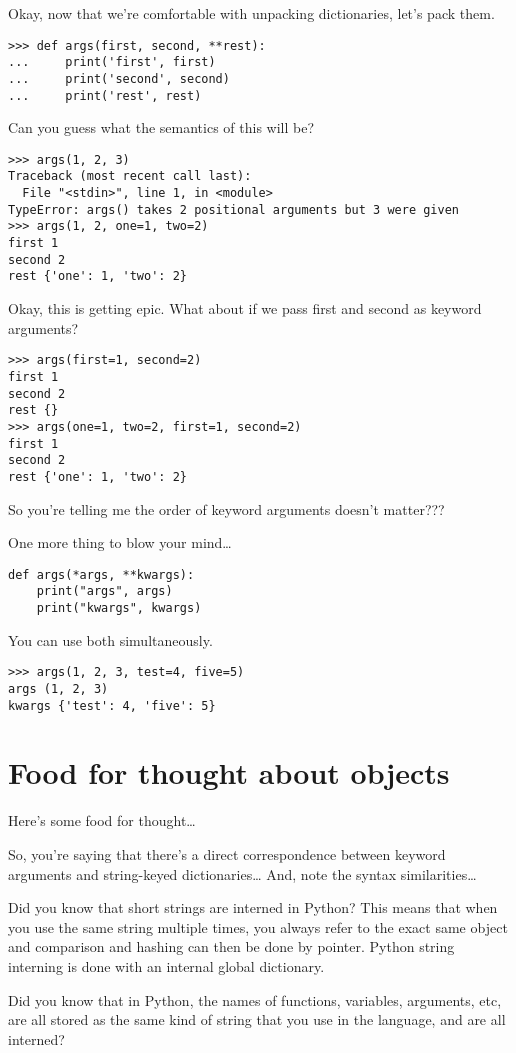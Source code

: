 \documentclass[11pt]{article}
\begin{document}
Okay, now that we're comfortable with unpacking dictionaries, let's
pack them.
\begin{verbatim}
>>> def args(first, second, **rest):
...     print('first', first)
...     print('second', second)
...     print('rest', rest)
\end{verbatim}
Can you guess what the semantics of this will be?
\begin{verbatim}
>>> args(1, 2, 3)
Traceback (most recent call last):
  File "<stdin>", line 1, in <module>
TypeError: args() takes 2 positional arguments but 3 were given
>>> args(1, 2, one=1, two=2)
first 1
second 2
rest {'one': 1, 'two': 2}
\end{verbatim}
Okay, this is getting epic. What about if we pass first and second
as keyword arguments?
\begin{verbatim}
>>> args(first=1, second=2)
first 1
second 2
rest {}
>>> args(one=1, two=2, first=1, second=2)
first 1
second 2
rest {'one': 1, 'two': 2}
\end{verbatim}
So you're telling me the order of keyword arguments doesn't matter???

One more thing to blow your mind\ldots{}

\begin{verbatim}
def args(*args, **kwargs):
    print("args", args)
    print("kwargs", kwargs)
\end{verbatim}

You can use both simultaneously. 
\begin{verbatim}
>>> args(1, 2, 3, test=4, five=5)
args (1, 2, 3)
kwargs {'test': 4, 'five': 5}
\end{verbatim}

\section{Food for thought about objects}
\label{sec:orgd3e77b6}
Here's some food for thought\ldots{}

So, you're saying that there's a direct correspondence between
keyword arguments and string-keyed dictionaries\ldots{} And, note the
syntax similarities\ldots{}

Did you know that short strings are interned in Python? This means
that when you use the same string multiple times, you always refer
to the exact same object and comparison and hashing can then be done
by pointer. Python string interning is done with an internal global
dictionary.

Did you know that in Python, the names of functions, variables,
arguments, etc, are all stored as the same kind of string that you
use in the language, and are all interned?
\end{document}
